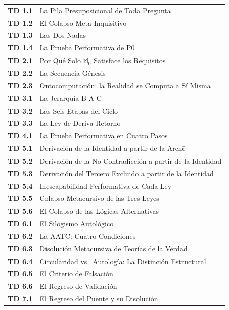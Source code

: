 \documentclass[10pt, openany, oneside]{book}
\renewcommand{\footnotesize}{\fontsize{8.5}{11}\selectfont}
\begin{document}
{\footnotesize
\noindent\begin{tabular}{r p{}}
\textbf{TD 1.1} & La Pila Presuposicional de Toda Pregunta \\[0.2em]
\textbf{TD 1.2} & El Colapso Meta-Inquisitivo \\[0.2em]
\textbf{TD 1.3} & Las Dos Nadas \\[0.2em]
\textbf{TD 1.4} & La Prueba Performativa de P0 \\[0.2em]
\textbf{TD 2.1} & Por Qué Solo $\mathbb{M}_0$ Satisface los Requisitos \\[0.2em]
\textbf{TD 2.2} & La Secuencia Génesis \\[0.2em]
\textbf{TD 2.3} & Ontocomputación: la Realidad se Computa a Sí Misma \\[0.2em]
\textbf{TD 3.1} & La Jerarquía B-A-C \\[0.2em]
\textbf{TD 3.2} & Las Seis Etapas del Ciclo \\[0.2em]
\textbf{TD 3.3} & La Ley de Deriva-Retorno \\[0.2em]
\textbf{TD 4.1} & La Prueba Performativa en Cuatro Pasos \\[0.2em]
\textbf{TD 5.1} & Derivación de la Identidad a partir de la Arch\={e} \\[0.2em]
\textbf{TD 5.2} & Derivación de la No-Contradicción a partir de la Identidad \\[0.2em]
\textbf{TD 5.3} & Derivación del Tercero Excluido a partir de la Identidad \\[0.2em]
\textbf{TD 5.4} & Inescapabilidad Performativa de Cada Ley \\[0.2em]
\textbf{TD 5.5} & Colapso Metacursivo de las Tres Leyes \\[0.2em]
\textbf{TD 5.6} & El Colapso de las Lógicas Alternativas \\[0.2em]
\textbf{TD 6.1} & El Silogismo Autológico \\[0.2em]
\textbf{TD 6.2} & La AATC: Cuatro Condiciones \\[0.2em]
\textbf{TD 6.3} & Disolución Metacursiva de Teorías de la Verdad \\[0.2em]
\textbf{TD 6.4} & Circularidad vs.\ Autología: La Distinción Estructural \\[0.2em]
\textbf{TD 6.5} & El Criterio de Falsación \\[0.2em]
\textbf{TD 6.6} & El Regreso de Validación \\[0.2em]
\textbf{TD 7.1} & El Regreso del Puente y su Disolución \\[0.2em]

\end{tabular}}
\end{document}
